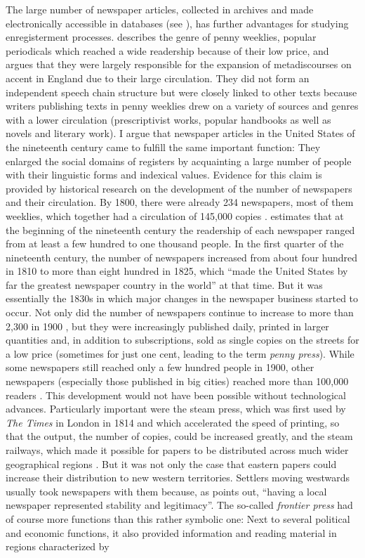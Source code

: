 The large number of newspaper articles, collected in archives and made electronically accessible in databases (see ), has further advantages for studying enregisterment processes. \citet{Agha2003} describes the genre of penny weeklies, popular periodicals which reached a wide readership because of their low price, and argues that they were largely responsible for the expansion of metadiscourses on accent in England due to their large circulation. They did not form an independent speech chain structure but were closely linked to other texts because writers publishing texts in penny weeklies drew on a variety of sources and genres with a lower circulation (prescriptivist works, popular handbooks as well as novels and literary work). I argue that newspaper articles in the United States of the nineteenth century came to fulfill the same important function: They enlarged the social domains of registers by acquainting a large number of people with their linguistic forms and indexical values. Evidence for this claim is provided by historical research on the development of the number of newspapers and their circulation. By 1800, there were already 234 newspapers, most of them weeklies, which together had a circulation of 145,000 copies \citep[149]{Copeland2002}. \citet[453]{Huntzicker1998} estimates that at the beginning of the nineteenth century the readership of each newspaper ranged from at least a few hundred to one thousand people. In the first quarter of the nineteenth century, the number of newspapers increased from about four hundred in 1810 to more than eight hundred in 1825, which “made the United States by far the greatest newspaper country in the world” \citep[88]{Nord2001} at that time. But it was essentially the 1830s in which major changes in the newspaper business started to occur. Not only did the number of newspapers continue to increase to more than 2,300 in 1900 \citep[453]{Huntzicker1998}, but they were increasingly published daily, printed in larger quantities and, in addition to subscriptions, sold as single copies on the streets for a low price (sometimes for just one cent, leading to the term \textit{penny press}). While some newspapers still reached only a few hundred people in 1900, other newspapers (especially those published in big cities) reached more than 100,000 readers \citep[453]{Huntzicker1998}. This development would not have been possible without technological advances. Particularly important were the steam press, which was first used by \emph{The Times} in London in 1814 and which accelerated the speed of printing, so that the output, the number of copies, could be increased greatly, and the steam railways, which made it possible for papers to be distributed across much wider geographical regions \citep[6]{Barker2002b}. But it was not only the case that eastern papers could increase their distribution to new western territories. Settlers moving westwards usually took newspapers with them because, as \citet[232]{Cloud1998} points out, “having a local newspaper represented stability and legitimacy”. The so-called \textit{frontier press} had of course more functions than this rather symbolic one: Next to several political and economic functions, it also provided information and reading material in regions characterized by 